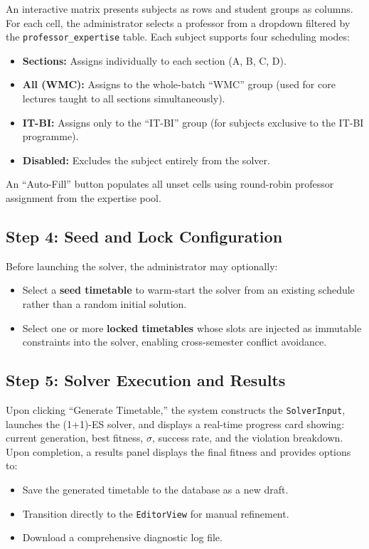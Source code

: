 An interactive matrix presents subjects as rows and student groups as columns. For each cell, the administrator selects a professor from a dropdown filtered by the \texttt{professor\_expertise} table. Each subject supports four scheduling modes:
\begin{itemize}
    \item \textbf{Sections:} Assigns individually to each section (A, B, C, D).
    \item \textbf{All (WMC):} Assigns to the whole-batch ``WMC'' group (used for core lectures taught to all sections simultaneously).
    \item \textbf{IT-BI:} Assigns only to the ``IT-BI'' group (for subjects exclusive to the IT-BI programme).
    \item \textbf{Disabled:} Excludes the subject entirely from the solver.
\end{itemize}

An ``Auto-Fill'' button populates all unset cells using round-robin professor assignment from the expertise pool.

\subsection{Step 4: Seed and Lock Configuration}

Before launching the solver, the administrator may optionally:
\begin{itemize}
    \item Select a \textbf{seed timetable} to warm-start the solver from an existing schedule rather than a random initial solution.
    \item Select one or more \textbf{locked timetables} whose slots are injected as immutable constraints into the solver, enabling cross-semester conflict avoidance.
\end{itemize}

\subsection{Step 5: Solver Execution and Results}

Upon clicking ``Generate Timetable,'' the system constructs the \texttt{SolverInput}, launches the (1+1)-ES solver, and displays a real-time progress card showing: current generation, best fitness, $\sigma$, success rate, and the violation breakdown. Upon completion, a results panel displays the final fitness and provides options to:
\begin{itemize}
    \item Save the generated timetable to the database as a new draft.
    \item Transition directly to the \texttt{EditorView} for manual refinement.
    \item Download a comprehensive diagnostic log file.
\end{itemize}

